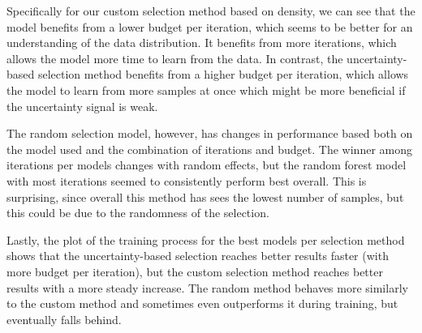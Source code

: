 \documentclass[12pt]{article}
\begin{document}
Specifically for our custom selection method based on density, we can see that the model benefits from a lower budget per iteration, which seems to be better for an understanding of the data distribution. It benefits from more iterations, which allows the model more time to learn from the data. In contrast, the uncertainty-based selection method benefits from a higher budget per iteration, which allows the model to learn from more samples at once which might be more beneficial if the uncertainty signal is weak.

 The random selection model, however, has changes in performance based both on the model used and the combination of iterations and budget. The winner among iterations per models changes with random effects, but the random forest model with most iterations seemed to consistently perform best overall. This is surprising, since overall this method has sees the lowest number of samples, but this could be due to the randomness of the selection.

 Lastly, the plot of the training process for the best models per selection method shows that the uncertainty-based selection reaches better results faster (with more budget per iteration), but the custom selection method reaches better results with a more steady increase. The random method behaves more similarly to the custom method and sometimes even outperforms it during training, but eventually falls behind.


\end{document}
